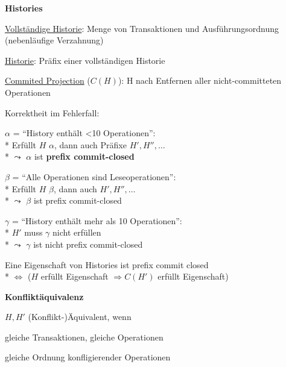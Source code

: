 \textbf{Histories}
\begin{items}
	\item \underline{Vollständige Historie}: Menge von Transaktionen und Ausführungsordnung (nebenläufige Verzahnung)
	\item \underline{Historie}: Präfix einer vollständigen Historie
	\item \underline{Commited Projection} (\( C(H) \)): H nach Entfernen aller nicht-committeten Operationen
	\item Korrektheit im Fehlerfall:
	\begin{enumeration}
		\item \( \alpha \) = ``History enthält <10 Operationen'': 
			\\*
			Erfüllt \( H \) \( \alpha \), dann auch Präfixe \( H', H'', \dots \)
			\\*
			\( \leadsto \) \( \alpha \) ist \textbf{prefix commit-closed}
		\item \( \beta \) = ``Alle Operationen sind Leseoperationen'':
			\\*
			Erfüllt \( H \) \( \beta \), dann auch \( H', H'', \dots \)
			\\*
			\( \leadsto \) \( \beta \) ist prefix commit-closed
		\item \( \gamma \) = ``History enthält mehr als 10 Operationen'':
			\\*
			\( H' \) muss \( \gamma \) nicht erfüllen \\*
			\( \leadsto \) \( \gamma \) ist nicht prefix commit-closed
	\end{enumeration}
	\item Eine Eigenschaft von Histories ist prefix commit closed
		\\*
		\( \Leftrightarrow \) (\( H \) erfüllt Eigenschaft \( \Rightarrow C(H') \) erfüllt Eigenschaft)
\end{items}

\textbf{Konfliktäquivalenz}
\begin{items}
	\item \( H, H' \) (Konflikt-)Äquivalent, wenn
	\begin{enumeration}
		\item gleiche Transaktionen, gleiche Operationen
		\item gleiche Ordnung konfligierender Operationen
	\end{enumeration}
\end{items}

